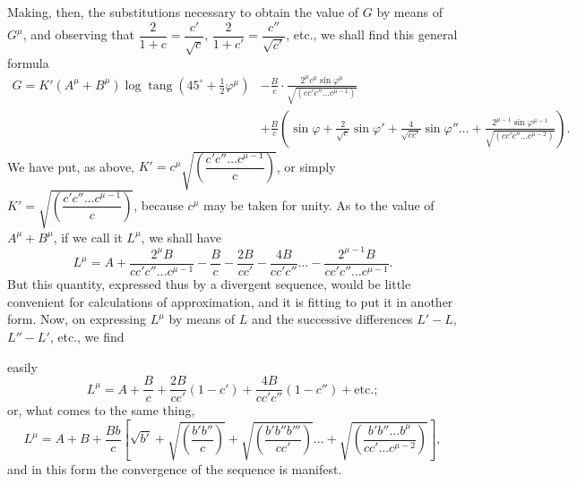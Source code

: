 \documentclass{article}
\begin{document}
Making, then, the substitutions necessary to obtain the value of $G$ by means of $G^{\mu}$, and observing that $\dfrac{2}{1+c}=\dfrac{c'}{\sqrt{c}}$, $\dfrac{2}{1+c'}=\dfrac{c''}{\sqrt{c'}}$, etc., we shall find this general formula
\[ \begin{aligned} G=K'(A^{\mu}+B^{\mu})\log\operatorname{tang}(45^{\circ}+\tfrac{1}{2}\varphi^{\mu})&-\frac{B}{c}\cdot\frac{2^{\mu}c^{\mu}\sin\varphi^{\mu}}{\sqrt{(cc'c''\ldots c^{\mu-1})}}\\ &+\frac{B}{c}\left(\sin\varphi+\frac{2}{\sqrt{c}}\sin\varphi'+\frac{4}{\sqrt{cc'}}\sin\varphi''\ldots+\frac{2^{\mu-1}\sin\varphi^{\mu-1}}{\sqrt{(cc'c''\ldots c^{\mu-2})}}\right). \end{aligned} \]
We have put, as above, $K'=c^{\mu}\sqrt{\left(\dfrac{c'c''\ldots c^{\mu-1}}{c}\right)}$, or simply $K'=\sqrt{\left(\dfrac{c'c''\ldots c^{\mu-1}}{c}\right)}$, because $c^{\mu}$ may be taken for unity. As to the value of $A^{\mu}+B^{\mu}$, if we call it $L^{\mu}$, we shall have
\[ L^{\mu}=A+\frac{2^{\mu}B}{cc'c''\ldots c^{\mu-1}}-\frac{B}{c}-\frac{2B}{cc'}-\frac{4B}{cc'c''}\ldots-\frac{2^{\mu-1}B}{cc'c''\ldots c^{\mu-1}}. \]
But this quantity, expressed thus by a divergent sequence, would be little convenient for calculations of approximation, and it is fitting to put it in another form. Now, on expressing $L^{\mu}$ by means of $L$ and the successive differences $L'-L$, $L''-L'$, etc., we find

easily
\[ L^{\mu}=A+\frac{B}{c}+\frac{2B}{cc'}(1-c')+\frac{4B}{cc'c''}(1-c'')+\text{etc.}; \]
or, what comes to the same thing,
\[ L^{\mu}=A+B+\frac{Bb}{c}\left[\sqrt{b'}+\sqrt{\left(\frac{b'b''}{c}\right)}+\sqrt{\left(\frac{b'b''b'''}{cc'}\right)}\ldots+\sqrt{\left(\frac{b'b''\ldots b^{\mu}}{cc'\ldots c^{\mu-2}}\right)}\right], \]
and in this form the convergence of the sequence is manifest.
\end{document}
